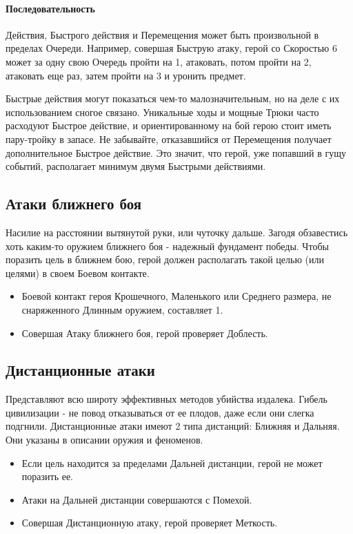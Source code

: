 \paragraph{Последовательность} Действия, Быстрого действия и Перемещения может быть произвольной в пределах Очереди. Например, совершая Быструю атаку, герой со Скоростью 6 может за одну свою Очередь пройти на 1, атаковать, потом пройти на 2, атаковать еще раз, затем пройти на 3 и уронить предмет.
\begin{tcolorbox}
  Быстрые действия могут показаться чем-то малозначительным, но на деле с их использованием сногое связано. Уникальные ходы и мощные Трюки часто расходуют Быстрое действие, и ориентированному на бой герою стоит иметь пару-тройку в запасе. Не забывайте, отказавшийся от Перемещения получает дополнительное Быстрое действие. Это значит, что герой, уже попавший в гущу событий, располагает минимум двумя Быстрыми действиями.
\end{tcolorbox}

\subsection{Атаки ближнего боя}
Насилие на расстоянии вытянутой руки, или чуточку дальше. Загодя обзавестись хоть каким-то оружием ближнего боя - надежный фундамент победы. 
\newline Чтобы поразить цель в ближнем бою, герой должен располагать такой целью (или целями) в своем Боевом контакте.
\begin{itemize}
  \item Боевой контакт героя Крошечного, Маленького или Среднего размера, не снаряженного Длинным оружием, составляет 1.
  \item Совершая Атаку ближнего боя, герой проверяет Доблесть.
\end{itemize}

\subsection{Дистанционные атаки}
Представляют всю широту эффективных методов убийства издалека. Гибель цивилизации -  не повод отказываться от ее плодов, даже если они слегка подгнили.
\newline Дистанционные атаки имеют 2 типа дистанций: Ближняя и Дальняя. Они указаны в описании оружия и феноменов.
\begin{itemize}
  \item Если цель находится за пределами Дальней дистанции, герой не может поразить ее.
  \item Атаки на Дальней дистанции совершаются с Помехой.
  \item Совершая Дистанционную атаку, герой проверяет Меткость.
\end{itemize}
